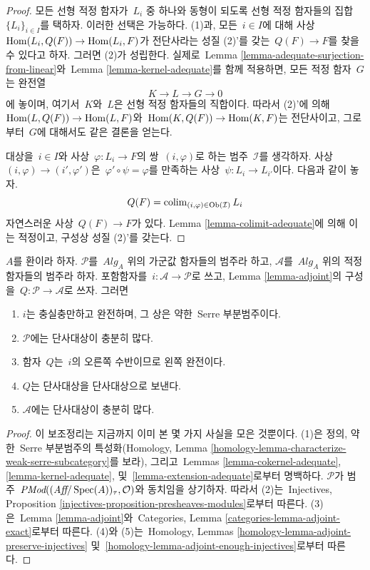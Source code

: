 \begin{proof}
모든 선형 적정 함자가\  $L_i$ 중 하나와 동형이 되도록 선형 적정 함자들의
집합\  $\{L_i\}_{i \in I}$를 택하자. 이러한 선택은 가능하다.
(1)과, 모든\  $i \in I$에 대해 사상\ 
$\mathop{\mathrm{Hom}}\nolimits(L_i, Q(F)) \to \mathop{\mathrm{Hom}}\nolimits(L_i, F)$가 전단사라는 성질 (2)'를 갖는\ 
$Q(F) \to F$를 찾을 수 있다고 하자. 그러면 (2)가 성립한다.
실제로\  Lemma \ref{lemma-adequate-surjection-from-linear}와\ 
Lemma \ref{lemma-kernel-adequate}를 함께 적용하면, 모든 적정 함자\ 
$G$는 완전열
$$
K \to L \to G \to 0
$$
에 놓이며, 여기서\  $K$와\  $L$은 선형 적정 함자들의 직합이다.
따라서 (2)'에 의해\ 
$\mathop{\mathrm{Hom}}\nolimits(L, Q(F)) \to \mathop{\mathrm{Hom}}\nolimits(L, F)$와\ 
$\mathop{\mathrm{Hom}}\nolimits(K, Q(F)) \to \mathop{\mathrm{Hom}}\nolimits(K, F)$는 전단사이고, 그로부터\  $G$에
대해서도 같은 결론을 얻는다.

\medskip\noindent
대상을\  $i \in I$와 사상\  $\varphi : L_i \to F$의 쌍\ 
$(i, \varphi)$로 하는 범주\  $\mathcal{I}$를 생각하자.
사상\  $(i, \varphi) \to (i', \varphi')$은\ 
$\varphi' \circ \psi = \varphi$를 만족하는 사상\ 
$\psi : L_i \to L_{i'}$이다. 다음과 같이 놓자.
$$
Q(F) = \mathop{\mathrm{colim}}\nolimits_{(i, \varphi) \in \mathop{\mathrm{Ob}}\nolimits(\mathcal{I})} L_i
$$
자연스러운 사상\  $Q(F) \to F$가 있다. Lemma
\ref{lemma-colimit-adequate}에 의해 이는 적정이고, 구성상 성질
(2)'를 갖는다.
\end{proof}

\begin{lemma}
\label{lemma-enough-injectives}
$A$를 환이라 하자. $\mathcal{P}$를\  $\textit{Alg}_A$ 위의 가군값
함자들의 범주라 하고, $\mathcal{A}$를\  $\textit{Alg}_A$ 위의 적정
함자들의 범주라 하자. 포함함자를\  $i : \mathcal{A} \to \mathcal{P}$로
쓰고, Lemma \ref{lemma-adjoint}의 구성을\ 
$Q : \mathcal{P} \to \mathcal{A}$로 쓰자. 그러면
\begin{enumerate}
\item $i$는 충실충만하고 완전하며, 그 상은 약한\  Serre 부분범주이다.
\item $\mathcal{P}$에는 단사대상이 충분히 많다.
\item 함자\  $Q$는\  $i$의 오른쪽 수반이므로 왼쪽 완전이다.
\item $Q$는 단사대상을 단사대상으로 보낸다.
\item $\mathcal{A}$에는 단사대상이 충분히 많다.
\end{enumerate}
\end{lemma}

\begin{proof}
이 보조정리는 지금까지 이미 본 몇 가지 사실을 모은 것뿐이다.
(1)은 정의, 약한\  Serre 부분범주의 특성화(Homology, Lemma
\ref{homology-lemma-characterize-weak-serre-subcategory}를 보라), 그리고\ 
Lemmas \ref{lemma-cokernel-adequate}, \ref{lemma-kernel-adequate},
및\  \ref{lemma-extension-adequate}로부터 명백하다.
$\mathcal{P}$가 범주\ 
$\textit{PMod}((\textit{Aff}/\mathop{\mathrm{Spec}}(A))_\tau, \mathcal{O})$와 동치임을
상기하자. 따라서 (2)는\  Injectives, Proposition
\ref{injectives-proposition-presheaves-modules}로부터 따른다.
(3)은\  Lemma \ref{lemma-adjoint}와\  Categories, Lemma
\ref{categories-lemma-adjoint-exact}로부터 따른다.
(4)와 (5)는\  Homology, Lemmas
\ref{homology-lemma-adjoint-preserve-injectives} 및\ 
\ref{homology-lemma-adjoint-enough-injectives}로부터 따른다.
\end{proof}

